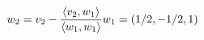 \documentclass[preview]{standalone}
\begin{document}
\begin{align*}
\special{dvisvgm:raw <g id='unique000'>}w_2=v_2-\frac{\langle v_2,w_1\rangle}{\langle w_1,w_1\rangle}w_1=(1/2,-1/2,1)\special{dvisvgm:raw </g>}
\end{align*}
\end{document}
